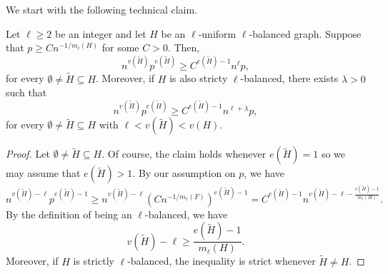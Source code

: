 \documentclass[11pt,a4paper,oneside,reqno]{amsart}
\newcommand{\1}{\mathbbm{1}} %
\renewcommand{\ge}{\geqslant}
\begin{document}
We start with the following technical claim.
\begin{claim}\label{claim:strictly-balanced}
    Let $\ell \ge 2$ be an integer and let $H$ be an $\ell$-uniform $\ell$-balanced graph. Suppose that $p \ge C n^{-1/m_\ell(H)}$ for some $C > 0$. Then,
    \[
        n^{v(\tilde{H})} p^{e(\tilde{H})} \ge C^{e(\tilde{H}) - 1} n^{\ell} p,
    \]
    for every $\emptyset \neq \tilde{H} \subseteq H$. Moreover, if $H$ is also stricty $\ell$-balanced, there exists $\lambda > 0$ such that 
    \[
        n^{v(\tilde{H})} p^{e(\tilde{H})} \ge C^{e(\tilde{H}) - 1} n^{\ell + \lambda} p,
    \]
    for every $\emptyset \neq \tilde{H} \subseteq H$ with $\ell < v(\tilde{H}) < v(H)$.
\end{claim}
\begin{proof}
    Let $\emptyset \neq \tilde{H} \subseteq H$. Of course, the claim holds whenever $e(\tilde{H}) = 1$ so we may assume that $e(\tilde{H}) > 1$. By our assumption on $p$, we have
    \[
        n^{v(\tilde{H}) - \ell} p^{e(\tilde{H}) - 1} \ge n^{v(\tilde{H}) - \ell} \left(C n^{-1/m_\ell(F)}\right)^{e(\tilde{H}) - 1} = C^{e(\tilde{H}) - 1} n^{v(\tilde{H}) - \ell - \frac{e(\tilde{H}) - 1}{m_\ell(H)}}.
    \]
    By the definition of being an $\ell$-balanced, we have
    \[
        v(\tilde{H}) - \ell \ge \frac{e(\tilde{H}) - 1}{m_\ell(H)}.
    \]
    Moreover, if $H$ is strictly $\ell$-balanced, the inequality is strict whenever $\tilde{H} \neq H$.
\end{proof}
\end{document}
